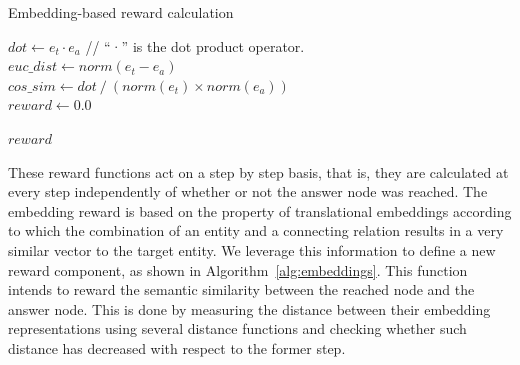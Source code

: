 \begin{algorithm}[!h]
\caption{Embedding-based reward calculation}
\label{alg:embeddings}

$dot \gets e_t \cdot e_a$ // ``·'' is the dot product operator. \\ 
$euc\_dist \gets norm(e_t - e_a)$\\
$cos\_sim \gets dot ~/~ (norm(e_t) \times norm(e_a))$\\
$reward \gets 0.0$\\




\Return $reward$
\end{algorithm}

These reward functions act on a step by step basis, that is, they are calculated at every step independently of whether or not the answer node was reached. The embedding reward is based on the property of translational embeddings according to which the combination of an entity and a connecting relation results in a very similar vector to the target entity. We leverage this information to define a new reward component, as shown in Algorithm~\ref{alg:embeddings}. This function intends to reward the semantic similarity between the reached node and the answer node. This is done by measuring the distance between their embedding representations using several distance functions and checking whether such distance has decreased with respect to the former step.

